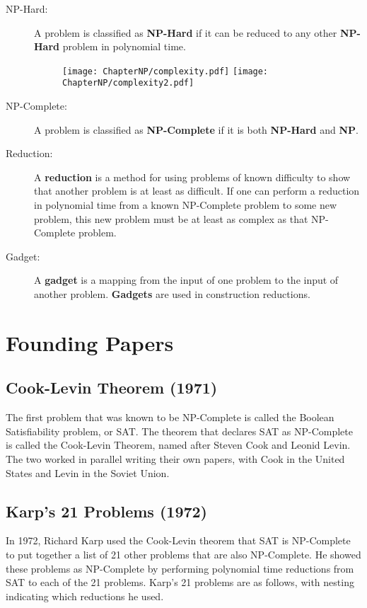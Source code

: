 \begin{description}
    \item[NP-Hard:] A problem is classified as \textbf{NP-Hard} if it can be reduced to any other \textbf{NP-Hard} problem in polynomial time.
    \begin{figure}[H]
        \centering
        \texttt{[image: ChapterNP/complexity.pdf]}
        \texttt{[image: ChapterNP/complexity2.pdf]}
    \end{figure}
    \item[NP-Complete:] A problem is classified as \textbf{NP-Complete} if it is both \textbf{NP-Hard} and \textbf{NP}.
    \item[Reduction:] A \textbf{reduction} is a method for using problems of known difficulty to show that another problem is at least as difficult. If one can perform a reduction in polynomial time from a known NP-Complete problem to some new problem, this new problem must be at least as complex as that NP-Complete problem.
    \item[Gadget:] A \textbf{gadget} is a mapping from the input of one problem to the input of another problem. \textbf{Gadgets} are used in construction reductions.
\end{description}

\section{Founding Papers}
\subsection{Cook-Levin Theorem (1971)}
    The first problem that was known to be NP-Complete is called the Boolean Satisfiability problem, or SAT. The theorem that declares SAT as NP-Complete is called the Cook-Levin Theorem, named after Steven Cook and Leonid Levin. The two worked in parallel writing their own papers, with Cook in the United States and Levin in the Soviet Union. 
\subsection{Karp's 21 Problems (1972)}
    In 1972, Richard Karp used the Cook-Levin theorem that SAT is NP-Complete to put together a list of 21 other problems that are also NP-Complete. He showed these problems as NP-Complete by performing polynomial time reductions from SAT to each of the 21 problems. Karp's 21 problems are as follows, with nesting indicating which reductions he used.



